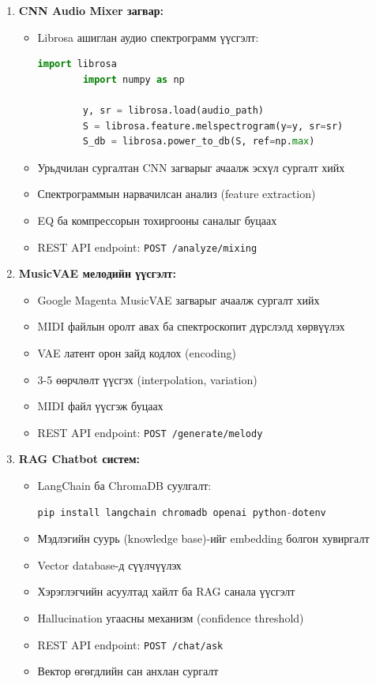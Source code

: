 \begin{enumerate}
    \item \textbf{CNN Audio Mixer загвар:}
    \begin{itemize}
        \item Librosa ашиглан аудио спектрограмм үүсгэлт:
        \begin{lstlisting}[language=Python]
        import librosa
        import numpy as np
        
        y, sr = librosa.load(audio_path)
        S = librosa.feature.melspectrogram(y=y, sr=sr)
        S_db = librosa.power_to_db(S, ref=np.max)
        \end{lstlisting}
        
        \item Урьдчилан сургалтан CNN загварыг ачаалж эсхүл сургалт хийх
        \item Спектрограммын нарвачилсан анализ (feature extraction)
        \item EQ ба компрессорын тохиргооны саналыг буцаах
        \item REST API endpoint: \texttt{POST /analyze/mixing}
    \end{itemize}
    
    \item \textbf{MusicVAE мелодийн үүсгэлт:}
    \begin{itemize}
        \item Google Magenta MusicVAE загварыг ачаалж сургалт хийх
        \item MIDI файлын оролт авах ба спектроскопит дүрслэлд хөрвүүлэх
        \item VAE латент орон зайд кодлох (encoding)
        \item 3-5 өөрчлөлт үүсгэх (interpolation, variation)
        \item MIDI файл үүсгэж буцаах
        \item REST API endpoint: \texttt{POST /generate/melody}
    \end{itemize}
    
    \item \textbf{RAG Chatbot систем:}
    \begin{itemize}
        \item LangChain ба ChromaDB суулгалт:
        \begin{lstlisting}[language=Python]
        pip install langchain chromadb openai python-dotenv
        \end{lstlisting}
        
        \item Мэдлэгийн суурь (knowledge base)-ийг embedding болгон хувиргалт
        \item Vector database-д сүүлчүүлэх
        \item Хэрэглэгчийн асуултад хайлт ба RAG санала үүсгэлт
        \item Hallucination угаасны механизм (confidence threshold)
        \item REST API endpoint: \texttt{POST /chat/ask}
        \item Вектор өгөгдлийн сан анхлан сургалт
    \end{itemize}
\end{enumerate}

